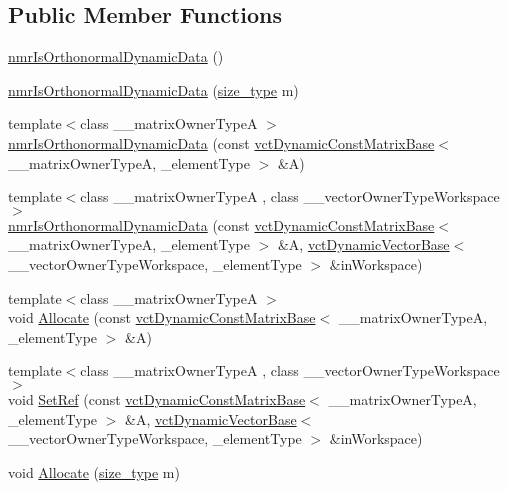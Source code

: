 \subsection*{Public Member Functions}
\begin{DoxyCompactItemize}
\item 
\hyperlink{classnmr_is_orthonormal_dynamic_data_ab391fa9a04f60d02959c3d13e764bec4}{nmr\+Is\+Orthonormal\+Dynamic\+Data} ()
\item 
\hyperlink{classnmr_is_orthonormal_dynamic_data_ac991a06c3c0fec670dfae47f7ac5b5c0}{nmr\+Is\+Orthonormal\+Dynamic\+Data} (\hyperlink{classnmr_is_orthonormal_dynamic_data_ae69581f9b270b49b1cd1d16ff29a5409}{size\+\_\+type} m)
\item 
{\footnotesize template$<$class \+\_\+\+\_\+matrix\+Owner\+Type\+A $>$ }\\\hyperlink{classnmr_is_orthonormal_dynamic_data_a97f8035f5f114758765107a6ea8a6211}{nmr\+Is\+Orthonormal\+Dynamic\+Data} (const \hyperlink{classvct_dynamic_const_matrix_base}{vct\+Dynamic\+Const\+Matrix\+Base}$<$ \+\_\+\+\_\+matrix\+Owner\+Type\+A, \+\_\+element\+Type $>$ \&A)
\item 
{\footnotesize template$<$class \+\_\+\+\_\+matrix\+Owner\+Type\+A , class \+\_\+\+\_\+vector\+Owner\+Type\+Workspace $>$ }\\\hyperlink{classnmr_is_orthonormal_dynamic_data_a2b836ee1ef2aa21f86ff6d11369c2722}{nmr\+Is\+Orthonormal\+Dynamic\+Data} (const \hyperlink{classvct_dynamic_const_matrix_base}{vct\+Dynamic\+Const\+Matrix\+Base}$<$ \+\_\+\+\_\+matrix\+Owner\+Type\+A, \+\_\+element\+Type $>$ \&A, \hyperlink{classvct_dynamic_vector_base}{vct\+Dynamic\+Vector\+Base}$<$ \+\_\+\+\_\+vector\+Owner\+Type\+Workspace, \+\_\+element\+Type $>$ \&in\+Workspace)
\item 
{\footnotesize template$<$class \+\_\+\+\_\+matrix\+Owner\+Type\+A $>$ }\\void \hyperlink{classnmr_is_orthonormal_dynamic_data_add92f655242035e2bc8f8f97b24fb928}{Allocate} (const \hyperlink{classvct_dynamic_const_matrix_base}{vct\+Dynamic\+Const\+Matrix\+Base}$<$ \+\_\+\+\_\+matrix\+Owner\+Type\+A, \+\_\+element\+Type $>$ \&A)
\item 
{\footnotesize template$<$class \+\_\+\+\_\+matrix\+Owner\+Type\+A , class \+\_\+\+\_\+vector\+Owner\+Type\+Workspace $>$ }\\void \hyperlink{classnmr_is_orthonormal_dynamic_data_a3c22679cdeeb67f381e53440bd44d50f}{Set\+Ref} (const \hyperlink{classvct_dynamic_const_matrix_base}{vct\+Dynamic\+Const\+Matrix\+Base}$<$ \+\_\+\+\_\+matrix\+Owner\+Type\+A, \+\_\+element\+Type $>$ \&A, \hyperlink{classvct_dynamic_vector_base}{vct\+Dynamic\+Vector\+Base}$<$ \+\_\+\+\_\+vector\+Owner\+Type\+Workspace, \+\_\+element\+Type $>$ \&in\+Workspace)
\item 
void \hyperlink{classnmr_is_orthonormal_dynamic_data_a80ddaedcad52886aaa0e08eee83c4aa7}{Allocate} (\hyperlink{classnmr_is_orthonormal_dynamic_data_ae69581f9b270b49b1cd1d16ff29a5409}{size\+\_\+type} m)
\end{DoxyCompactItemize}

